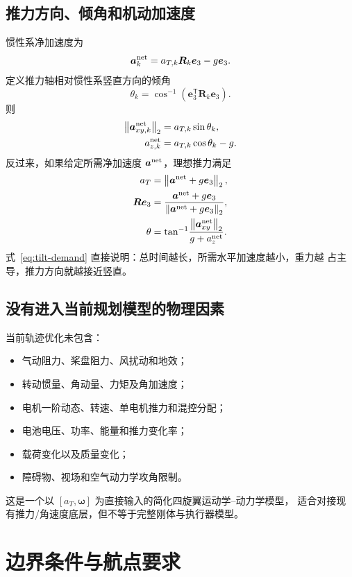 \documentclass[UTF8,a4paper,11pt]{ctexart}
\newcommand{\normtwo}[1]{\left\lVert#1\right\rVert_2}
\begin{document}
\subsection{推力方向、倾角和机动加速度}

惯性系净加速度为
\begin{equation}
 \bm a_k^{\rm net}=a_{T,k}\bm R_k\bm e_3-g\bm e_3.
 \label{eq:net-acc}
\end{equation}
定义推力轴相对惯性系竖直方向的倾角
\begin{equation}
 \theta_k=\cos^{-1}\!\left(\bm e_3^\mathsf T\bm R_k\bm e_3\right).
\end{equation}
则
\begin{align}
 \normtwo{\bm a_{xy,k}^{\rm net}}&=a_{T,k}\sin\theta_k,\\
 a_{z,k}^{\rm net}&=a_{T,k}\cos\theta_k-g.
\end{align}
反过来，如果给定所需净加速度 $\bm a^{\rm net}$，理想推力满足
\begin{align}
 a_T&=\normtwo{\bm a^{\rm net}+g\bm e_3},\\
 \bm R\bm e_3&=\frac{\bm a^{\rm net}+g\bm e_3}
 {\normtwo{\bm a^{\rm net}+g\bm e_3}},\\
 \theta&=\tan^{-1}\!\frac{\normtwo{\bm a_{xy}^{\rm net}}}{g+a_z^{\rm net}}.
 \label{eq:tilt-demand}
\end{align}
式~\eqref{eq:tilt-demand} 直接说明：总时间越长，所需水平加速度越小，重力越
占主导，推力方向就越接近竖直。

\subsection{没有进入当前规划模型的物理因素}

当前轨迹优化未包含：
\begin{itemize}
  \item 气动阻力、桨盘阻力、风扰动和地效；
  \item 转动惯量、角动量、力矩及角加速度；
  \item 电机一阶动态、转速、单电机推力和混控分配；
  \item 电池电压、功率、能量和推力变化率；
  \item 载荷变化以及质量变化；
  \item 障碍物、视场和空气动力学攻角限制。
\end{itemize}
这是一个以 $[a_T,\bm\omega]$ 为直接输入的简化四旋翼运动学--动力学模型，
适合对接现有推力/角速度底层，但不等于完整刚体与执行器模型。

\section{边界条件与航点要求}
\end{document}
